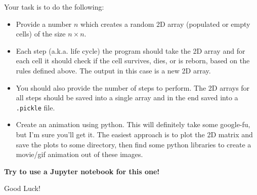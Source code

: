 \documentclass{article}
\begin{document}
Your task is to do the following:

\begin{itemize}
	\item Provide a number $n$ which creates a random 2D array (populated or empty cells) of the size $n \times n$.
	\item Each step (a.k.a. life cycle) the program should take the 2D array and for each cell it should check if the cell survives, dies, or is reborn, based on the rules defined above. The output in this case is a new 2D array.
	\item You should also provide the number of steps to perform. The 2D arrays for all steps should be saved into a single array and in the end saved into a {\tt .pickle} file.
	\item Create an animation using python. This will definitely take some google-fu, but I'm sure you'll get it. The easiest approach is to plot the 2D matrix and save the plots to some directory, then find some python libraries to create a movie/gif animation out of these images.
\end{itemize}

{\bf Try to use a Jupyter notebook for this one!}

Good Luck!
\end{document}
